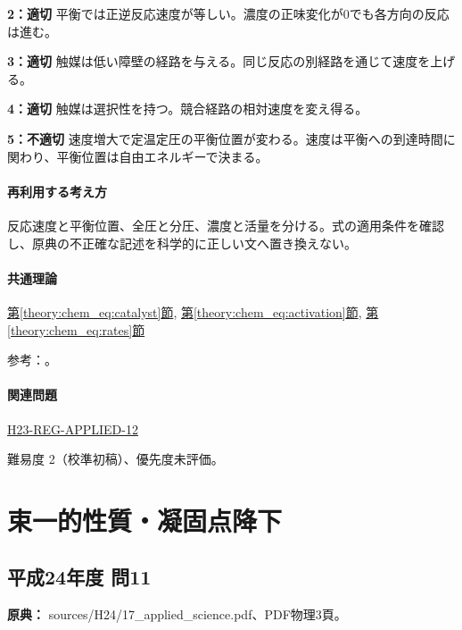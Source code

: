 \noindent\textbf{2：適切} 平衡では正逆反応速度が等しい。濃度の正味変化が0でも各方向の反応は進む。\par

\noindent\textbf{3：適切} 触媒は低い障壁の経路を与える。同じ反応の別経路を通じて速度を上げる。\par

\noindent\textbf{4：適切} 触媒は選択性を持つ。競合経路の相対速度を変え得る。\par

\noindent\textbf{5：不適切} 速度増大で定温定圧の平衡位置が変わる。速度は平衡への到達時間に関わり、平衡位置は自由エネルギーで決まる。\par

\paragraph{再利用する考え方} 反応速度と平衡位置、全圧と分圧、濃度と活量を分ける。式の適用条件を確認し、原典の不正確な記述を科学的に正しい文へ置き換えない。

\paragraph{共通理論} \hyperref[theory:chem_eq:catalyst]{第\ref*{theory:chem_eq:catalyst}節}, \hyperref[theory:chem_eq:activation]{第\ref*{theory:chem_eq:activation}節}, \hyperref[theory:chem_eq:rates]{第\ref*{theory:chem_eq:rates}節}

\par 参考：\cite{iupac_greenbook2012}。

\paragraph{関連問題} \hyperref[q:h23-reg-applied-12]{H23-REG-APPLIED-12}

\par 難易度 2（校準初稿）、優先度未評価。

\section{束一的性質・凝固点降下}

\subsection{平成24年度 問11}
\label{q:h24-reg-applied-11}

\noindent\textbf{原典：} sources/H24/17\_applied\_science.pdf、PDF物理3頁。

